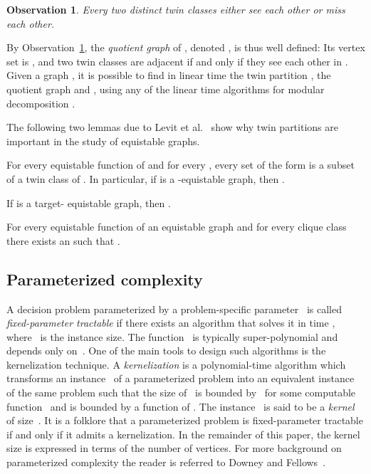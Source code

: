 \documentclass{llncs}
\newtheorem{observation}[theorem]{Observation}
\begin{document}
\begin{observation}\label{j34fskf}
Every two distinct twin classes either see each other or miss each other.
\end{observation}

By Observation~\ref{j34fskf}, the {\em quotient graph} of , denoted , is thus well defined: Its vertex set is , and two twin classes are adjacent if and only if they see each other in . Given a graph , it is possible to find in linear time the twin partition , the quotient graph  and , using any of the linear time algorithms for modular decomposition \cite{MR2500307, DBLP:conf/caap/CournierH94, MR1687819}.

The following two lemmas due to Levit et al.~\cite{MR3040147} show why twin partitions are important in the study of equistable graphs.

\begin{lemma}\label{lem:same-weight}
For every equistable function  of  and for every , every set of the form  is a subset of a twin class of .
In particular, if  is a -equistable graph, then .
\end{lemma}

\begin{corollary}\label{cor:target-t-number-of-classes}
If  is a target- equistable graph, then .
\end{corollary}

\begin{lemma}\label{lem:twin-same-weight}
For every equistable function  of an equistable graph  and for every clique class  there exists an  such that
.
\end{lemma}

\subsection{Parameterized complexity}

\begin{sloppypar}
A decision problem parameterized by a problem-specific parameter~ is called \emph{fixed-parameter tractable} if there exists an algorithm that solves it in time \hbox{}, where~ is the instance size.
The function~ is typically super-polynomial and depends only on~.
One of the main tools to design such algorithms is the kernelization technique.
A \emph{kernelization} is a polynomial-time algorithm which transforms an instance~ of a parameterized problem into an equivalent instance~ of the same problem such that the size of~ is bounded by~ for some computable function~ and  is bounded by a function of .
The instance~ is said to be a \emph{kernel} of size~.
It is a folklore that a parameterized problem is fixed-parameter tractable if and only if it admits a kernelization. In the remainder of this paper, the kernel size is expressed in terms of the number of vertices.
For more background on parameterized complexity the reader is referred to
Downey and Fellows~\cite{DF13}.
\end{sloppypar}
\end{document}
